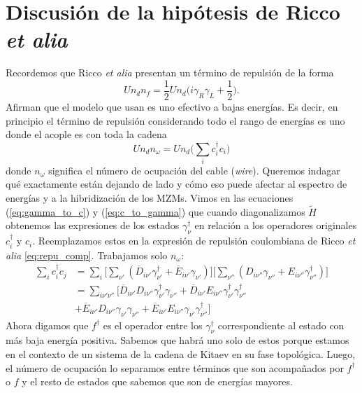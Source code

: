 \section{Discusión de la hipótesis de Ricco \emph{et  alia}}
Recordemos que Ricco \emph{et alia} presentan un t\'{e}rmino de repulsi\'{o}n de la forma
\begin{equation}
    Un_d n_f=\frac{1}{2}U n_d\Big( i\gamma_R\gamma_L+\frac{1}{2}\Big).
\end{equation}
Afirman que el modelo que usan es uno efectivo a bajas energ\'{i}as. Es decir, en principio el t\'{e}rmino de repulsi\'{o}n considerando todo el rango de energ\'{i}as es uno donde el acople es con toda la cadena
\begin{equation}
    Un_dn_\omega=Un_d\Big(\sum_i c^\dagger_i c_i\Big)
    \label{eq:repu_comp}
\end{equation}
donde $n_\omega$ significa el n\'{u}mero de ocupaci\'{o}n del cable (\emph{wire}). Queremos indagar qu\'{e} exactamente est\'{a}n dejando de lado y c\'{o}mo eso puede afectar al espectro de energ\'{i}as y a la hibridizaci\'{o}n de los MZMs. 
Vimos en las ecuaciones (\ref{eq:gamma_to_c}) y (\ref{eq:c_to_gamma}) que cuando diagonalizamos $\tilde H$ obtenemos las expresiones de los estados $\gamma^\dagger_\nu$ en relaci\'{o}n a los operadores originales $c^\dagger_i$ y $c_i$. Reemplazamos estos en la expresi\'{o}n de repulsi\'{o}n coulombiana de Ricco \emph{et alia} \ref{eq:repu_comp}. Trabajamos solo $n_\omega$:
\begin{equation}
    \begin{split}
        \sum_i c_i^\dagger c_j&=\sum_i\Big[ 
\sum_{\nu'}(\overline{D}_{i\nu'}\gamma_{\nu'}^\dagger + \overline{E}_{i\nu'}\gamma_{\nu'}) \Big]\Big[ 
\sum_{\nu''}(D_{i\nu''}\gamma_{\nu''} + E_{i\nu''}\gamma^\dagger_{\nu''}) \Big]\\
&=\sum_{i\nu'\nu''}\Big[ \overline{D}_{i\nu'}D_{i\nu''}\gamma_{\nu'}^\dagger\gamma_{\nu''}+\overline{D}_{i\nu'}E_{i\nu''}\gamma^\dagger_{\nu'}\gamma^\dagger_{\nu''}\\
&+\overline{E}_{i\nu'}D_{i\nu''}\gamma_{\nu'}\gamma_{\nu''}+\overline{E}_{i\nu'}E_{i\nu''}\gamma_{\nu'}\gamma^\dagger_{\nu''}\Big]
    \end{split}
\end{equation}
Ahora digamos que $f^\dagger$ es el operador entre los $\gamma_\nu^\dagger$ correspondiente al estado con m\'{a}s baja energ\'{i}a positiva. Sabemos que habr\'{a} uno solo de estos porque estamos en el contexto de un sistema de la cadena de Kitaev en su fase topol\'{o}gica. Luego, el n\'{u}mero de ocupaci\'{o}n lo separamos entre t\'{e}rminos que son acompa\~{n}ados por $f^\dagger$ o $f$ y el resto de estados que sabemos que son de energ\'{i}as mayores.

